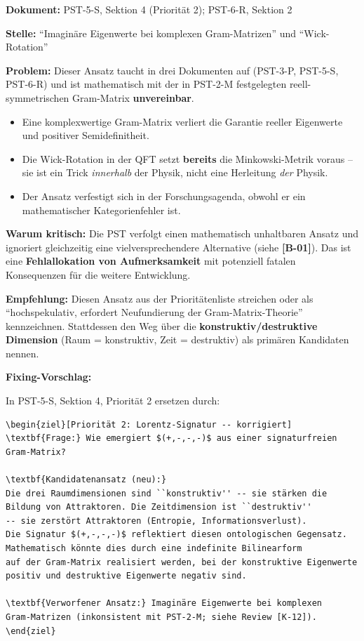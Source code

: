 \documentclass[11pt,a4paper]{article}
\newcommand{\Dok}[1]{\noindent\textbf{Dokument:} #1\par\smallskip}
\newcommand{\Stelle}[1]{\noindent\textbf{Stelle:} #1\par\smallskip}
\newcommand{\Prob}[1]{\noindent\textbf{Problem:} #1\par\smallskip}
\newcommand{\Krit}[1]{\noindent\textbf{Warum kritisch:} #1\par\smallskip}
\newcommand{\Empf}[1]{\noindent\textbf{Empfehlung:} #1\par\smallskip}
\newenvironment{Fix}
  {\par\medskip\noindent\textbf{Fixing-Vorschlag:}\par\nobreak\smallskip}
  {\par\medskip}
\begin{document}
\Dok{PST-5-S, Sektion 4 (Priorität 2); PST-6-R, Sektion 2}
\Stelle{``Imaginäre Eigenwerte bei komplexen Gram-Matrizen'' und
``Wick-Rotation''}
\Prob{Dieser Ansatz taucht in drei Dokumenten auf (PST-3-P, PST-5-S,
PST-6-R) und ist mathematisch mit der in PST-2-M festgelegten
reell-symmetrischen Gram-Matrix \textbf{unvereinbar}.
\begin{itemize}
  \item Eine komplexwertige Gram-Matrix verliert die Garantie
    reeller Eigenwerte und positiver Semidefinitheit.
  \item Die Wick-Rotation in der QFT setzt \textbf{bereits} die
    Minkowski-Metrik voraus -- sie ist ein Trick \emph{innerhalb}
    der Physik, nicht eine Herleitung \emph{der} Physik.
  \item Der Ansatz verfestigt sich in der Forschungsagenda, obwohl
    er ein mathematischer Kategorienfehler ist.
\end{itemize}}
\Krit{Die PST verfolgt einen mathematisch unhaltbaren Ansatz und
ignoriert gleichzeitig eine vielversprechendere Alternative (siehe
\textbf{[B-01]}). Das ist eine \textbf{Fehlallokation von
Aufmerksamkeit} mit potenziell fatalen Konsequenzen für die
weitere Entwicklung.}
\Empf{Diesen Ansatz aus der Prioritätenliste streichen oder als
``hochspekulativ, erfordert Neufundierung der Gram-Matrix-Theorie''
kennzeichnen. Stattdessen den Weg über die
\textbf{konstruktiv/destruktive Dimension} (Raum = konstruktiv, Zeit
= destruktiv) als primären Kandidaten nennen.}
\begin{Fix}
In PST-5-S, Sektion 4, Priorität 2 ersetzen durch:
\begin{verbatim}
\begin{ziel}[Priorität 2: Lorentz-Signatur -- korrigiert]
\textbf{Frage:} Wie emergiert $(+,-,-,-)$ aus einer signaturfreien
Gram-Matrix?

\textbf{Kandidatenansatz (neu):}
Die drei Raumdimensionen sind ``konstruktiv'' -- sie stärken die
Bildung von Attraktoren. Die Zeitdimension ist ``destruktiv''
-- sie zerstört Attraktoren (Entropie, Informationsverlust).
Die Signatur $(+,-,-,-)$ reflektiert diesen ontologischen Gegensatz.
Mathematisch könnte dies durch eine indefinite Bilinearform
auf der Gram-Matrix realisiert werden, bei der konstruktive Eigenwerte
positiv und destruktive Eigenwerte negativ sind.

\textbf{Verworfener Ansatz:} Imaginäre Eigenwerte bei komplexen
Gram-Matrizen (inkonsistent mit PST-2-M; siehe Review [K-12]).
\end{ziel}
\end{verbatim}
\end{Fix}
\end{document}
